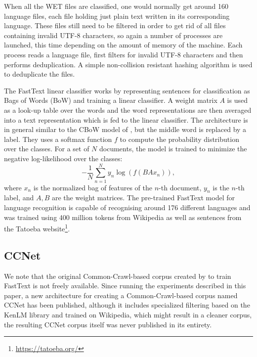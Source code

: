 When all the WET files are classified, one would normally get around 160 language files, each file holding just plain text written in its corresponding language. These files still need to be filtered in order to get rid of all files containing invalid UTF-8 characters, so again a number of processes are launched, this time depending on the amount of memory of the machine. Each process reads a language file, first filters for invalid UTF-8 characters and then performs deduplication. A simple non-collision resistant hashing algorithm is used to deduplicate the files.

The FastText linear classifier works by representing sentences for classification as Bags of Words (BoW) and training a linear classifier. A weight matrix $A$ is used as a look-up table over the words and the word representations are then averaged into a text representation which is fed to the linear classifier. The architecture is in general similar to the CBoW model of \citet{mikolov-etal-2013-distributed}, but the middle word is replaced by a label. They uses a softmax function $f$ to compute the probability distribution over the classes. For a set of $N$ documents, the model is trained to minimize the negative log-likelihood over the classes:
\[
    -\frac{1}{N}\sum_{n=1}^{N} y_n\log\left(f(BAx_n)\right),
\]
where $x_n$ is the normalized bag of features of the $n$-th document, $y_n$ is the $n$-th label, and $A,B$ are the weight matrices. The pre-trained FastText model for language recognition \citep{grave-etal-2018-learning} is capable of recognising around 176 different languages and was trained using 400 million tokens from Wikipedia as well as sentences from the Tatoeba website\footnote{\url{https://tatoeba.org/}}.

\subsection{CCNet}

We note that the original Common-Crawl-based corpus created by \citet{grave-etal-2018-learning} to train FastText is not freely available. Since running the experiments described in this paper, a new architecture for creating a Common-Crawl-based corpus named CCNet \citep{wenzek-etal-2020-ccnet} has been published, although it includes specialized filtering based on the KenLM library \cite{heafield-2011-kenlm} and trained on Wikipedia, which might result in a cleaner corpus, the resulting CCNet corpus itself was never published in its entirety.


